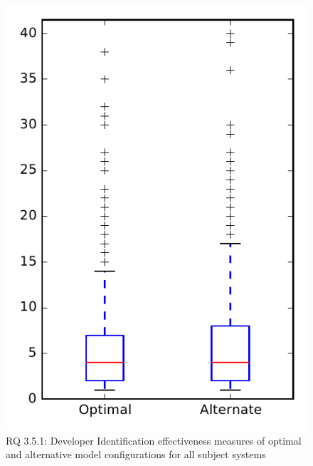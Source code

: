
\begin{figure}
\centering
\includegraphics[height=0.4\textheight]{figures/combo/dit_rq1_overview}
\caption{RQ 3.5.1: Developer Identification effectiveness measures of optimal and alternative model configurations for all subject systems}
\label{fig:combo:dit:rq1:overview}
\end{figure}
